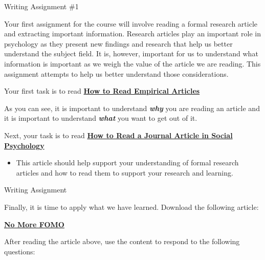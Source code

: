 \documentclass[
]{book}
\providecommand{\tightlist}{%
  \setlength{\itemsep}{0pt}\setlength{\parskip}{0pt}}
\begin{document}
\begin{assessment}
{Writing Assignment \#1}

Your first assignment for the course will involve reading a formal research article and extracting important information. Research articles play an important role in psychology as they present new findings and research that help us better understand the subject field. It is, however, important for us to understand what information is important as we weigh the value of the article we are reading. This assignment attempts to help us better understand those considerations.

Your first task is to read \href{assets/unit_4/Assessment_Empirical_Short.pdf}{\textbf{How to Read Empirical Articles}}

As you can see, it is important to understand \textbf{\emph{why}} you are reading an article and it is important to understand \textbf{\emph{what}} you want to get out of it.

Next, your task is to read \href{assets/unit_4/Assessment_Empirical_Long.pdf}{\textbf{How to Read a Journal Article in Social Psychology}}

\begin{itemize}
\tightlist
\item
  This article should help support your understanding of formal research articles and how to read them to support your research and learning.
\end{itemize}

{Writing Assignment}

Finally, it is time to apply what we have learned. Download the following article:

\href{assets/unit_4/Assessment_FOMO_Article.pdf}{\textbf{No More FOMO}}

After reading the article above, use the content to respond to the following questions:


\end{assessment}
\end{document}
